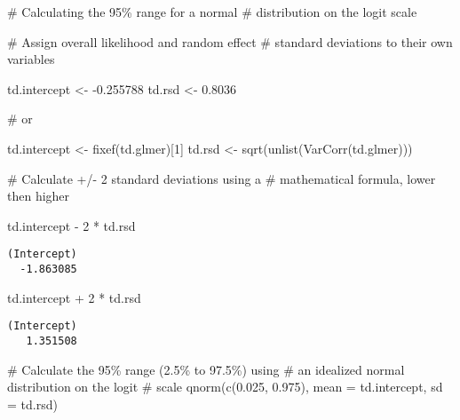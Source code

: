 \documentclass[
  10pt,
  letterpaper]{article}
\newenvironment{Shaded}{\begin{snugshade}}{\end{snugshade}}
\newcommand{\AttributeTok}[1]{\textcolor[rgb]{0.40,0.45,0.13}{#1}}
\newcommand{\CommentTok}[1]{\textcolor[rgb]{0.37,0.37,0.37}{#1}}
\newcommand{\DecValTok}[1]{\textcolor[rgb]{0.68,0.00,0.00}{#1}}
\newcommand{\FloatTok}[1]{\textcolor[rgb]{0.68,0.00,0.00}{#1}}
\newcommand{\FunctionTok}[1]{\textcolor[rgb]{0.28,0.35,0.67}{#1}}
\newcommand{\NormalTok}[1]{\textcolor[rgb]{0.00,0.23,0.31}{#1}}
\newcommand{\OtherTok}[1]{\textcolor[rgb]{0.00,0.23,0.31}{#1}}
\newcommand{\SpecialCharTok}[1]{\textcolor[rgb]{0.37,0.37,0.37}{#1}}
\begin{document}
\begin{Shaded}
\begin{Highlighting}[]
\CommentTok{\# Calculating the 95\% range for a normal}
\CommentTok{\# distribution on the logit scale}

\CommentTok{\# Assign overall likelihood and random effect}
\CommentTok{\# standard deviations to their own variables}

\NormalTok{td.intercept }\OtherTok{\textless{}{-}} \SpecialCharTok{{-}}\FloatTok{0.255788}
\NormalTok{td.rsd }\OtherTok{\textless{}{-}} \FloatTok{0.8036}

\CommentTok{\# or}

\NormalTok{td.intercept }\OtherTok{\textless{}{-}} \FunctionTok{fixef}\NormalTok{(td.glmer)[}\DecValTok{1}\NormalTok{]}
\NormalTok{td.rsd }\OtherTok{\textless{}{-}} \FunctionTok{sqrt}\NormalTok{(}\FunctionTok{unlist}\NormalTok{(}\FunctionTok{VarCorr}\NormalTok{(td.glmer)))}

\CommentTok{\# Calculate +/{-} 2 standard deviations using a}
\CommentTok{\# mathematical formula, lower then higher}

\NormalTok{td.intercept }\SpecialCharTok{{-}} \DecValTok{2} \SpecialCharTok{*}\NormalTok{ td.rsd}
\end{Highlighting}
\end{Shaded}

\begin{verbatim}
(Intercept) 
  -1.863085 
\end{verbatim}

\begin{Shaded}
\begin{Highlighting}[]
\NormalTok{td.intercept }\SpecialCharTok{+} \DecValTok{2} \SpecialCharTok{*}\NormalTok{ td.rsd}
\end{Highlighting}
\end{Shaded}

\begin{verbatim}
(Intercept) 
   1.351508 
\end{verbatim}

\begin{Shaded}
\begin{Highlighting}[]
\CommentTok{\# Calculate the 95\% range (2.5\% to 97.5\%) using}
\CommentTok{\# an idealized normal distribution on the logit}
\CommentTok{\# scale}
\FunctionTok{qnorm}\NormalTok{(}\FunctionTok{c}\NormalTok{(}\FloatTok{0.025}\NormalTok{, }\FloatTok{0.975}\NormalTok{), }\AttributeTok{mean =}\NormalTok{ td.intercept, }\AttributeTok{sd =}\NormalTok{ td.rsd)}
\end{Highlighting}
\end{Shaded}
\end{document}
